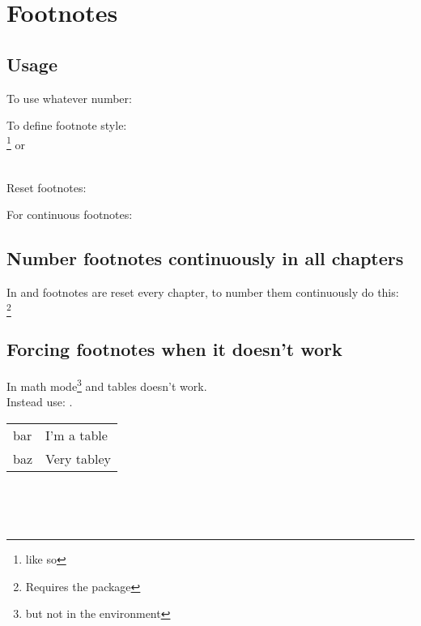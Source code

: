\section{Footnotes}
\subsection{Usage}

To use whatever number:\\

To define footnote style:\\
\footnote{like so} or\\

\\
\renewcommand{\thefootnote}{\arabic{footnote}}

Reset footnotes:\\
\codeshow{\setcounter{footnote}{0}}

For continuous footnotes:\\


\subsection{Number footnotes continuously in all chapters}
In \book and \report footnotes are reset every chapter, to number them continuously do this:\\
\footnote{Requires the package }

\subsection{Forcing footnotes when it doesn't work}
In math mode\footnote[19]{but not in the  environment} and tables
\code{\footnote} doesn't work.\\
Instead use: .
\\
\begin{example5}
\begin{tabular}{l l}
  bar\footnotemark & I'm a table \\
  baz\footnotemark & Very tabley\\
\end{tabular}
\\
\end{example5}

\\

  